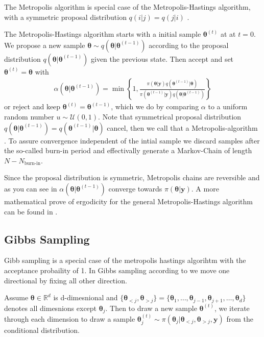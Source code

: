 The Metropolis algorithm is special case of the Metropolis-Hastings algorithm, with a symmetric proposal distribution $q(i|j) =q(j|i) $ \cite{}.

The Metropolis-Hastings algorithm starts with a initial sample $\bm{\theta}^{(t)}$ at  at $t=0$.
We propose a new sample $\bm{\theta}\sim q(\bm{\theta} | \bm{\theta}^{(t-1)})$ according to the proposal distribution $q(\bm{\theta} | \bm{\theta}^{(t-1)})$ given the previous state.
Then accept and set $ \bm{\theta}^{(t)} = \bm{\theta}$ with
\begin{align}
\alpha(\bm{\theta} | \bm{\theta}^{(t-1)}) = \min \left\{ 1, \frac{\pi(\bm{\theta}  | \bm{y}) q(\bm{\theta}^{(t-1)} | \bm{\theta})  }{\pi(\bm{\theta}^{(t-1)}| \bm{y}) q(\bm{\theta} | \bm{\theta}^{(t-1)}) } \right\}
\end{align}
or reject and keep $\bm{\theta}^{(t)} = \bm{\theta}^{(t-1)}$, which we do by comparing $\alpha$ to a uniform random number $u \sim \mathcal{U}(0,1)$.
Note that symmetrical proposal distribution $q(\bm{\theta} | \bm{\theta}^{(t-1)}) = q(\bm{\theta}^{(t-1)} | \bm{\theta}) $ cancel, then we call that a Metropolis-algorithm \cite{}.
To assure convergence independent of the intial sample we discard samples after the so-called burn-in period and effectivally generate a Markov-Chain of length $N - N_{\text{burn-in}}$.



Since the proposal distribution is symmetric, Metropolis chains are reversible and as you can see in $\alpha(\bm{\theta} | \bm{\theta}^{(t-1)})$ converge towards $\pi(\bm{\theta}| \bm{y})$.
A more mathematical prove of ergodicity for the general Metropolis-Hastings algorithm can be found in \cite{}.

\subsection{Gibbs Sampling}
Gibb sampling is a special case of the metropolis hastings algorihtm with the acceptance probaility of 1.
In Gibbs sampling according to \cite{} we move one directional by fixing all other direction.

Assume $\bm{\theta} \in \mathbb{R}^d$ is d-dimesnional and $\{\bm{\theta}_{<j}, \bm{\theta}_{>j} \}  = \{\bm{\theta}_{1}, \dots, \bm{\theta}_{j-1}, \bm{\theta}_{j+1}, \dots, \bm{\theta}_{d} \} $ denotes all dimesnions except $ \bm{\theta}_{j}$.
Then to draw a new sample $\bm{\theta}^{(t)}$, we iterate through each dimension to draw a sample $\bm{\theta}_j^{(t)} \sim  \pi(\bm{\theta}_j | \bm{\theta}_{<j}, \bm{\theta}_{>j} , \bm{y} )$ from the conditional distribution.

